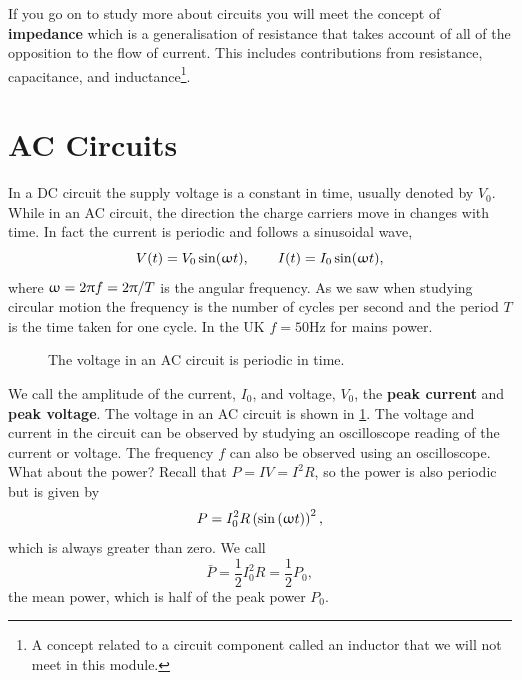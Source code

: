 \documentclass[a4paper,12pt]{book}
\begin{document}
If you go on to study more about circuits you will meet the concept of \textbf{impedance} which is a generalisation of resistance that takes account of all of the opposition to the flow of current. This includes contributions from resistance, capacitance, and inductance\footnote{A concept related to a circuit component called an inductor that we will not meet in this module.}.

\section{AC Circuits}
In a DC circuit the supply voltage is a constant in time, usually denoted by  $V_{0}$. While in an AC circuit, the direction the charge carriers move in changes with time. In fact the current is periodic and follows a sinusoidal wave, 
\begin{equation*}
V(t)=V_{0}\sin(\upomega t),\qquad I(t)=I_{0}\sin(\upomega t),
\end{equation*}
where $\upomega=2\uppi f=2\uppi/T$ is the angular frequency. As we saw when studying circular motion the frequency is the number of cycles per second and the period $T$ is the time taken for one cycle. In the UK $f=50\text{Hz}$ for mains power.\\

\begin{figure}[ht]
    \centering
    \caption{The voltage in an AC circuit is periodic in time.}
        \label{fig: AC voltage}
\end{figure}

We call the amplitude of the current, $I_{0}$, and voltage, $V_{0}$, the \textbf{peak current} and \textbf{peak voltage}. The voltage in an AC circuit is shown in \cref{fig: AC voltage}. The voltage and current in the circuit can be observed by studying an oscilloscope reading of the current or voltage. The frequency $f$ can also be observed using an oscilloscope. What about the power? Recall that $P=IV=I^{2}R$, so the power is also periodic but is given by
\begin{equation*}
P=I_{0}^{2}R\left(\sin\left(\upomega t\right)\right)^{2},
\end{equation*}
which is always greater than zero. We call 
\begin{equation*}
\bar{P}=\frac{1}{2}I_{0}^{2}R=\frac{1}{2}P_{0},
\end{equation*}
the mean power, which is half of the peak power $P_{0}$.\\
\end{document}
